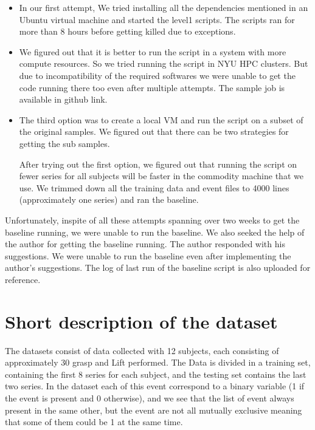 \documentclass[final,leqno,onefignum,onetabnum]{siamltexmm}
\begin{document}
\begin{itemize}
  \item In our first attempt, We tried installing all the dependencies mentioned in an Ubuntu virtual machine and started the level1 scripts.  The scripts ran for more than 8 hours before getting killed due to exceptions.
  \item We figured out that it is better to run the script in a system with more compute resources.  So we tried running the script in NYU HPC clusters.  But due to incompatibility of the required softwares we were unable to get the code running there too even after multiple attempts.  The sample job is available in github link\cite{hpcjob}.
  \item The third option was to create a local VM and run the script on a subset of the original samples.  We figured out that there can be two strategies for getting the sub samples.  
    After trying out the first option, we figured out that running the script on fewer series for all subjects will be faster in the commodity machine that we use.  We trimmed down all the training data and event files to 4000 lines (approximately one series) and ran the baseline.  
\end{itemize}

Unfortunately, inspite of all these attempts spanning over two weeks to get the baseline running, we were unable to run the baseline.  We also seeked the help of the author for getting the baseline running.  The author responded with his suggestions.  We were unable to run the baseline even after implementing the author's suggestions\cite{orurepo}.  The log of last run of the baseline script is also uploaded for reference\cite{runlog}.

\section{Short description of the dataset}
The  datasets consist of data collected with 12 subjects, each consisting of approximately 30 grasp and Lift performed. The Data is divided in a training set, containing the first 8 series for each subject, and  the testing set contains the last two series.
In the dataset each of this event correspond to a binary variable (1 if the event is present and 0 otherwise), and we see that the list of event always present in the same other, but the event are not all mutually exclusive meaning that some of  them could be 1 at the same time.  
\end{document}
